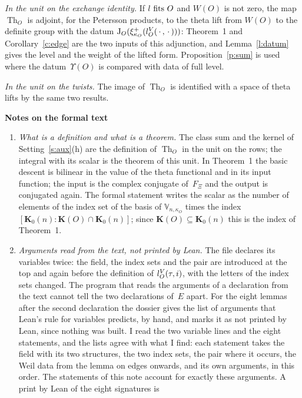 \documentclass[11pt,a4paper]{article}
\newcommand{\m}[1]{\mbox{$#1$}}        %
\newcommand{\sect}[2]{\refstepcounter{section}\label{#2}\par\addvspace{19pt plus 4pt minus 2pt}\Needspace{7\baselineskip}%
  \noindent\llap{{\fontsize{13.2}{16}\selectfont\bfseries\color{inkfaint}\thesection}\hspace{9pt}}%
  {\fontsize{13.2}{16}\selectfont\bfseries\color{ink}#1}\par\nopagebreak\vspace{-1pt}}
\theoremstyle{plainx}
\theoremstyle{uprightx}
\newcommand{\Kz}[1]{\mathbf{K}_{0}(#1)}
\newcommand{\WO}[1]{W(#1)}
\newcommand{\kap}[1]{\kappa_{#1}}
\newcommand{\KO}[1]{\mathbf{K}(#1)}
\newcommand{\Ups}[1]{\Upsilon(#1)}
\newcommand{\JO}[2]{\operatorname{J}_{#1}(#2)}
\newcommand{\Vk}[2]{\mathbb{V}_{#1,#2}}
\newcommand{\vplus}[2]{\xi^{+}_{#1}(#2)}
\begin{document}
\emph{In the unit on the exchange identity.} If \m{\FitsParams{O}{l}} and $\WO{O}$ is not zero, the map
\m{\operatorname{Th}_{O}} is adjoint, for the Petersson products, to the theta lift from \m{\WO{O}} to the definite
group with the datum \m{\JO{O}{\vplus{\kap{O}}{\paramV{O}{\,\cdot\,}{\,\cdot\,}}}}: Theorem~1 and Corollary~\ref{c:edge} are the two inputs of this
adjunction, and Lemma~\ref{l:datum} gives the level and the weight of the lifted form.
Proposition~\ref{p:sum} is used where the datum~$\Ups{O}$ is compared with data of full level.

\emph{In the unit on the twists.} The image of \m{\operatorname{Th}_{O}} is identified with a space of theta lifts by
the same two results.

\sect{Notes on the formal text}{s:notes}
\begin{enumerate}[label=\textup{\arabic*.},leftmargin=1.6em,itemsep=5pt]
\item \emph{What is a definition and what is a theorem.} The class sum and the kernel of Setting~\ref{s:aux}(h)
are the definition of \m{\operatorname{Th}_{O}} in the unit on the rows; the integral with its scalar is the theorem
of this unit. In Theorem~1 the basic descent is bilinear in the value of the theta functional and in its input
function; the input is the complex conjugate of~$F_{\Xi}$ and the output is conjugated again. The formal statement
writes the scalar as the number of elements of the index set of the basis of \m{\Vk{n}{\kap{O}}} times the index
\m{[\Kz{n}:\KO{O}\cap\Kz{n}]}; since \m{\KO{O}\subseteq\Kz{n}} this is the index of Theorem~1.
\item \emph{Arguments read from the text, not printed by Lean.} The file declares its variables twice: the
field, the index sets and the pair are introduced at the top and again before the definition of
\m{\paramV{O}{\tau}{i}}, with the letters of the index sets changed. The program that reads the arguments of a
declaration from the text cannot tell the two declarations of~$E$ apart. For the eight lemmas after the second
declaration the dossier gives the list of arguments that Lean's rule for variables predicts, by hand, and marks
it as not printed by Lean, since nothing was built. I read the two variable lines and the eight statements, and
the lists agree with what I find: each statement takes the field with its two structures, the two index sets,
the pair where it occurs, the Weil data from the lemma on edges onwards, and its own arguments, in this order.
The statements of this note account for exactly these arguments. A print by Lean of the eight signatures is

\end{enumerate}
\end{document}
